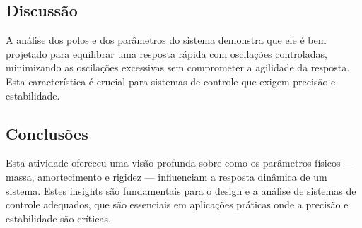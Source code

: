 \subsection{Discussão}
A análise dos polos e dos parâmetros do sistema demonstra que ele é bem projetado para equilibrar uma resposta rápida com oscilações controladas, minimizando as oscilações excessivas sem comprometer a agilidade da resposta. Esta característica é crucial para sistemas de controle que exigem precisão e estabilidade.

\subsection{Conclusões}
Esta atividade ofereceu uma visão profunda sobre como os parâmetros físicos — massa, amortecimento e rigidez — influenciam a resposta dinâmica de um sistema. Estes insights são fundamentais para o design e a análise de sistemas de controle adequados, que são essenciais em aplicações práticas onde a precisão e estabilidade são críticas.
